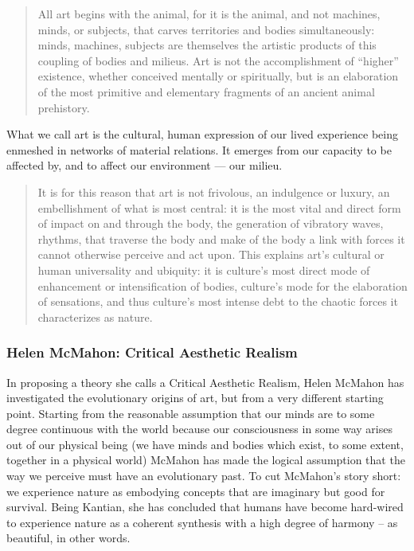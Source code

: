             \begin{quote}
                All art begins with the animal, for it is the animal, and not machines, minds, or subjects, that carves territories and bodies simultaneously: minds, machines, subjects are themselves the artistic products of this coupling of bodies and milieus. Art is not the accomplishment of “higher” existence, whether conceived mentally or spiritually, but is an elaboration of the most primitive and elementary fragments of an ancient animal prehistory. \citep[p.35]{GroszChaosTerritoryArt2008}
            \end{quote}

            What we call art is the cultural, human expression of our lived experience being enmeshed in networks of material relations. It emerges from our capacity to be affected by, and to affect our environment — our milieu. 
            
            \begin{quote}
                It is for this reason that art is not frivolous, an indulgence or luxury, an embellishment of what is most central: it is the most vital and direct form of impact on and through the body, the generation of vibratory waves, rhythms, that traverse the body and make of the body a link with forces it cannot otherwise perceive and act upon. This explains art's cultural or human universality and ubiquity: it is culture's most direct mode of enhancement or intensification of bodies, culture's mode for the elaboration of sensations, and thus culture's most intense debt to the chaotic forces it characterizes as nature.
            \end{quote}
        
        \subsubsection{Helen McMahon: Critical Aesthetic Realism} \label{sec:CriticalAestheticRealism} 

            In proposing a theory she calls a Critical Aesthetic Realism, Helen McMahon has investigated the evolutionary origins of art, but from a very different starting point. Starting from the reasonable assumption that our minds are to some degree continuous with the world because our consciousness in some way arises out of our physical being (we have minds and bodies which exist, to some extent, together in a physical world) McMahon has made the logical assumption that the way we perceive must have an evolutionary past. To cut McMahon's story short: we experience nature as embodying concepts that are imaginary but good for survival. Being Kantian, she has concluded that humans have become hard-wired to experience nature as a coherent synthesis with a high degree of harmony – as beautiful, in other words. 

